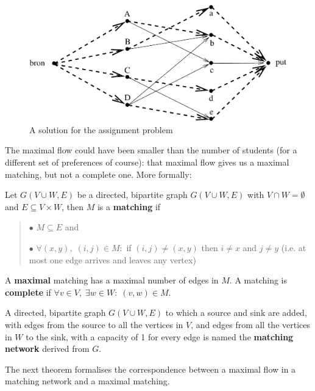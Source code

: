 \begin{figure}[ht]
\begin{center}
\includegraphics[width=0.5\linewidth,keepaspectratio]{matching3} %
\end{center}
\caption{A solution for the assignment problem\label{matching3}}
\end{figure}


The maximal flow could have been smaller than the number of
students (for a different set of preferences of course): that maximal
flow gives us a maximal matching, but not a complete one. More
formally:


 \begin{definition}
{\rm Let $G(V \cup W,E)$ be a directed, bipartite graph $G(V \cup
W,E)$ with $V \cap W = \emptyset$ and $E \subseteq V \times W$, then
$M$ is a \textbf{matching} if
\begin{verse}
\hspace*{1ex}$\bullet$
$M \subseteq E$ and

\hspace*{1ex}$\bullet$
$\forall (x,y),\;(i,j) \in M:$ if $(i,j) \neq (x,y)$ then
$i \neq x$ and $j \neq y$
(i.e. at most one edge arrives and leaves any vertex)
\end{verse}
A \textbf{maximal} matching has a maximal number of edges in $M$. A
matching is \textbf{complete} if $\forall v \in V,\; \exists w\in W:\;
(v,w) \in M$.  }
\end{definition}

A directed, bipartite graph $G(V \cup W,E)$ to which a source and sink
are added, with edges from the source to all the vertices in $V$, and edges from
all the vertices in $W$ to the sink, with a capacity of 1 for every
edge is named the \textbf{matching network} derived from $G$.


The next theorem formalises the correspondence between a maximal
flow in a matching network and a maximal matching.

